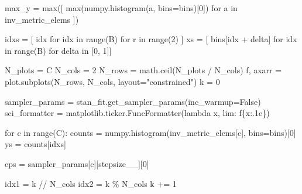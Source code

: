 \documentclass[
  letterpaper,
  DIV=11,
  numbers=noendperiod]{scrartcl}
\newenvironment{Shaded}{\begin{snugshade}}{\end{snugshade}}
\newcommand{\BuiltInTok}[1]{\textcolor[rgb]{0.00,0.23,0.31}{#1}}
\newcommand{\ControlFlowTok}[1]{\textcolor[rgb]{0.00,0.23,0.31}{#1}}
\newcommand{\DecValTok}[1]{\textcolor[rgb]{0.68,0.00,0.00}{#1}}
\newcommand{\KeywordTok}[1]{\textcolor[rgb]{0.00,0.23,0.31}{#1}}
\newcommand{\NormalTok}[1]{\textcolor[rgb]{0.00,0.23,0.31}{#1}}
\newcommand{\OperatorTok}[1]{\textcolor[rgb]{0.37,0.37,0.37}{#1}}
\newcommand{\SpecialCharTok}[1]{\textcolor[rgb]{0.37,0.37,0.37}{#1}}
\newcommand{\SpecialStringTok}[1]{\textcolor[rgb]{0.13,0.47,0.30}{#1}}
\newcommand{\StringTok}[1]{\textcolor[rgb]{0.13,0.47,0.30}{#1}}
\newcommand{\VariableTok}[1]{\textcolor[rgb]{0.07,0.07,0.07}{#1}}
\begin{document}
\begin{Shaded}
\begin{Highlighting}[]
\NormalTok{  max\_y }\OperatorTok{=} \BuiltInTok{max}\NormalTok{([ }\BuiltInTok{max}\NormalTok{(numpy.histogram(a, bins}\OperatorTok{=}\NormalTok{bins)[}\DecValTok{0}\NormalTok{]) }\ControlFlowTok{for}\NormalTok{ a }\KeywordTok{in}\NormalTok{ inv\_metric\_elems ])}
  
\NormalTok{  idxs }\OperatorTok{=}\NormalTok{ [ idx }\ControlFlowTok{for}\NormalTok{ idx }\KeywordTok{in} \BuiltInTok{range}\NormalTok{(B) }\ControlFlowTok{for}\NormalTok{ r }\KeywordTok{in} \BuiltInTok{range}\NormalTok{(}\DecValTok{2}\NormalTok{) ]}
\NormalTok{  xs }\OperatorTok{=}\NormalTok{ [ bins[idx }\OperatorTok{+}\NormalTok{ delta] }\ControlFlowTok{for}\NormalTok{ idx }\KeywordTok{in} \BuiltInTok{range}\NormalTok{(B) }\ControlFlowTok{for}\NormalTok{ delta }\KeywordTok{in}\NormalTok{ [}\DecValTok{0}\NormalTok{, }\DecValTok{1}\NormalTok{]]}
  
\NormalTok{  N\_plots }\OperatorTok{=}\NormalTok{ C}
\NormalTok{  N\_cols }\OperatorTok{=} \DecValTok{2}
\NormalTok{  N\_rows }\OperatorTok{=}\NormalTok{ math.ceil(N\_plots }\OperatorTok{/}\NormalTok{ N\_cols)}
\NormalTok{  f, axarr }\OperatorTok{=}\NormalTok{ plot.subplots(N\_rows, N\_cols, layout}\OperatorTok{=}\StringTok{"constrained"}\NormalTok{)}
\NormalTok{  k }\OperatorTok{=} \DecValTok{0}
  
\NormalTok{  sampler\_params }\OperatorTok{=}\NormalTok{ stan\_fit.get\_sampler\_params(inc\_warmup}\OperatorTok{=}\VariableTok{False}\NormalTok{)}
\NormalTok{  sci\_formatter }\OperatorTok{=}\NormalTok{ matplotlib.ticker.FuncFormatter(}\KeywordTok{lambda}\NormalTok{ x, lim: }\SpecialStringTok{f\textquotesingle{}}\SpecialCharTok{\{}\NormalTok{x}\SpecialCharTok{:.1e\}}\SpecialStringTok{\textquotesingle{}}\NormalTok{)}
  
  \ControlFlowTok{for}\NormalTok{ c }\KeywordTok{in} \BuiltInTok{range}\NormalTok{(C):}
\NormalTok{    counts }\OperatorTok{=}\NormalTok{ numpy.histogram(inv\_metric\_elems[c], bins}\OperatorTok{=}\NormalTok{bins)[}\DecValTok{0}\NormalTok{]}
\NormalTok{    ys }\OperatorTok{=}\NormalTok{ counts[idxs]}
    
\NormalTok{    eps }\OperatorTok{=}\NormalTok{ sampler\_params[c][}\StringTok{\textquotesingle{}stepsize\_\_\textquotesingle{}}\NormalTok{][}\DecValTok{0}\NormalTok{]}
    
\NormalTok{    idx1 }\OperatorTok{=}\NormalTok{ k }\OperatorTok{//}\NormalTok{ N\_cols}
\NormalTok{    idx2 }\OperatorTok{=}\NormalTok{ k }\OperatorTok{\%}\NormalTok{ N\_cols}
\NormalTok{    k }\OperatorTok{+=} \DecValTok{1}
    

\end{Highlighting}
\end{Shaded}
\end{document}
